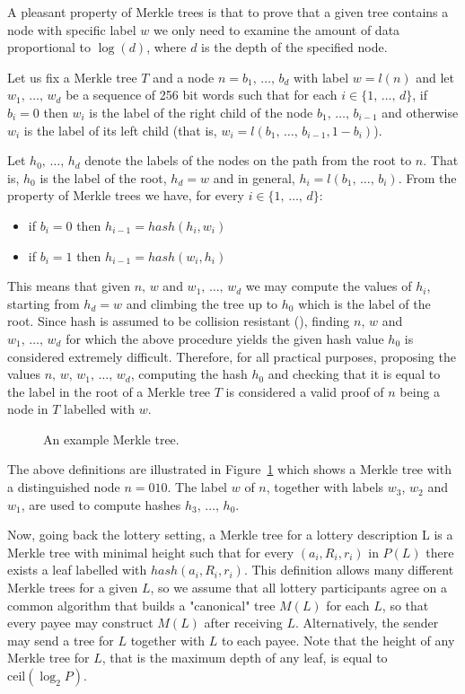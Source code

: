 \documentclass[a4paper]{article}
\begin{document}
    A pleasant property of Merkle trees is that to prove that a given tree contains a node with specific label $w$
    we only need to examine the amount of data proportional to $\log(d)$, where $d$ is the depth of the specified node.

    Let us fix a Merkle tree $T$ and a node $n = b_1,\,\ldots,\,b_d$ with label $w = l(n)$ and let $w_1,\,\ldots,\,w_d$
    be a sequence of 256 bit words such that for each $i \in \{1,\,\ldots,\,d\}$, if $b_i = 0$ then $w_i$ is the label
    of the right child of the node $b_1,\,\ldots,\, b_{i-1}$ and otherwise $w_i$ is the label of its left child
    (that is, $w_i = l(b_1, \,\ldots,\,b_{i-1}, 1 - b_i)$).

    Let $h_0,\,\ldots,\, h_d$ denote the labels of the nodes on the path from the root to $n$. That is, $h_0$ is
    the label of the root, $h_d = w$ and in general, $h_i = l(b_1,\,\ldots,\,b_i)$. From the property of Merkle trees
    we have, for every $i \in \{1,\,\ldots,\,d\}$:
    \begin{itemize}
        \item if $b_i = 0$ then $h_{i-1} = hash(h_i, w_i)$
        \item if $b_i = 1$ then $h_{i-1} = hash(w_i, h_i)$
    \end{itemize}
    This means that given $n,\, w$ and $w_1,\,\ldots,\,w_d$ we may compute the values of $h_i$, starting from $h_d = w$
    and climbing the tree up to $h_0$ which is the label of the root. Since hash is assumed to be collision resistant
    (\cite{SHA3}), finding $n$, $w$ and $w_1,\,\ldots,\,w_d$ for which the above procedure yields the given
    hash value $h_0$ is considered extremely difficult. Therefore, for all practical purposes, proposing the values
    $n,\,w,\,w_1,\,\ldots,\,w_d$, computing the hash $h_0$ and checking that it is equal to the label in the root of
    a Merkle tree $T$ is considered a valid proof of $n$ being a node in $T$ labelled with $w$.

    \begin{figure}
        
        \caption{An example Merkle tree.}
        \label{fig:merkle}
    \end{figure}

    The above definitions are illustrated in Figure~\ref{fig:merkle} which shows a Merkle tree with a distinguished
    node $n = 010$. The label $w$ of $n$, together with labels $w_3$, $w_2$ and $w_1$, are used to compute hashes
    $h_3, \,\ldots, \,h_0$.


    Now, going back the lottery setting, a Merkle tree for a lottery description L is a Merkle tree with minimal height
    such that for every $(a_i, R_i, r_i)$ in $P(L)$ there exists a leaf labelled with $hash(a_i, R_i, r_i)$.
    This definition allows many different Merkle trees for a given $L$, so we assume that all lottery participants
    agree on a common algorithm that builds a "canonical" tree $M(L)$ for each $L$, so that every payee may construct
    $M(L)$ after receiving $L$. Alternatively, the sender may send a tree for $L$ together with $L$ to each payee.
    Note that the height of any Merkle tree for $L$, that is the maximum depth of any leaf, is equal to
    $\text{ceil}(\log_2 P)$.
\end{document}
